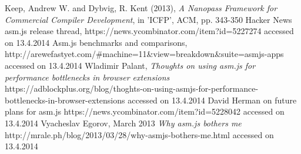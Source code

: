 \documentclass[11pt]{report}
\begin{document}
\begin{thebibliography}{1}
     Keep, Andrew W. and Dybvig, R. Kent (2013), {\em A Nanopass Framework for Commercial Compiler Development}, in 'ICFP', ACM, pp. 343-350
     Hacker News asm.js release thread, https://news.ycombinator.com/item?id=5227274 accessed on 13.4.2014
     Asm.js benchmarks and comparisons, http://arewefastyet.com/\#machine=11\&view=breakdown\&suite=asmjs-apps accessed on 13.4.2014
     Wladimir Palant, {\em Thoughts on using asm.js for performance bottlenecks in browser extensions} https://adblockplus.org/blog/thoghts-on-using-asmjs-for-performance-bottlenecks-in-browser-extensions accessed on 13.4.2014
     David Herman on future plans for asm.js https://news.ycombinator.com/item?id=5228042 accessed on 13.4.2014
     Vyacheslav Egorov, March 2013 {\em Why asm.js bothers me} http://mrale.ph/blog/2013/03/28/why-asmjs-bothers-me.html accessed on 13.4.2014
\end{thebibliography}
\endgroup
\end{document}
